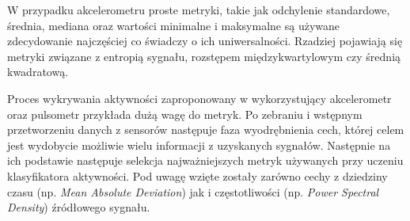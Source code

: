 
W przypadku akcelerometru proste metryki, takie jak odchylenie standardowe, średnia, mediana oraz wartości minimalne i maksymalne są używane zdecydowanie najczęściej co świadczy o ich uniwersalności. Rzadziej pojawiają się metryki związane z entropią sygnału, rozstępem międzykwartylowym czy średnią kwadratową.

Proces wykrywania aktywności zaproponowany w \cite{S04} wykorzystujący akcelerometr oraz pulsometr przykłada dużą wagę do metryk. Po zebraniu i wstępnym przetworzeniu danych z sensorów następuje faza wyodrębnienia cech, której celem jest wydobycie możliwie wielu informacji z uzyskanych sygnałów. Następnie na ich podstawie następuje selekcja najważniejszych metryk używanych przy uczeniu klasyfikatora aktywności. Pod uwagę wzięte zostały zarówno cechy z dziedziny czasu (np. {\it Mean Absolute Deviation}) jak i częstotliwości (np. {\it Power Spectral Density}) źródłowego sygnału.

